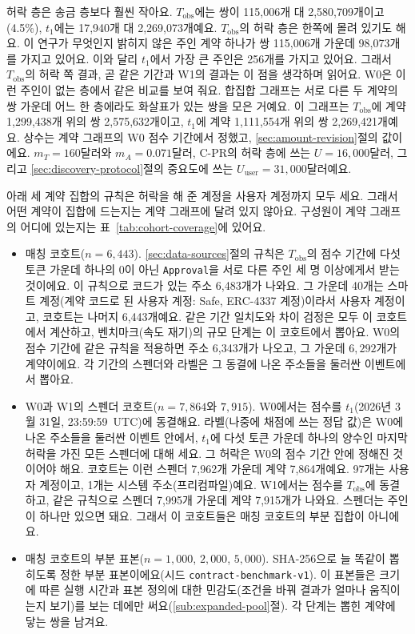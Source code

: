 

허락 층은 송금 층보다 훨씬 작아요. $T_{\mathrm{obs}}$에는 쌍이 115,006개 대 2,580,709개이고(4.5\%), $t_1$에는 17,940개 대 2,269,073개예요. $T_{\mathrm{obs}}$의 허락 층은 한쪽에 몰려 있기도 해요. 이 연구가 무엇인지 밝히지 않은 주인 계약 하나가 쌍 115,006개 가운데 98,073개를 가지고 있어요. 이와 달리 $t_1$에서 가장 큰 주인은 256개를 가지고 있어요. 그래서 $T_{\mathrm{obs}}$의 허락 쪽 결과, 곧 같은 기간과 W1의 결과는 이 점을 생각하며 읽어요. W0은 이런 주인이 없는 층에서 같은 비교를 보여 줘요. 합집합 그래프는 서로 다른 두 계약의 쌍 가운데 어느 한 층에라도 화살표가 있는 쌍을 모은 거예요. 이 그래프는 $T_{\mathrm{obs}}$에 계약 1,299,438개 위의 쌍 2,575,632개이고, $t_1$에 계약 1,111,554개 위의 쌍 2,269,421개예요. 상수는 계약 그래프의 W0 점수 기간에서 정했고, \ref{sec:amount-revision}절의 값이에요. $m_T=160$달러와 $m_A=0.071$달러, \mbox{C-PR}의 허락 층에 쓰는 $U=16{,}000$달러, 그리고 \ref{sec:discovery-protocol}절의 중요도에 쓰는 $U_{\mathrm{user}}=31{,}000$달러예요.


아래 세 계약 집합의 규칙은 허락을 해 준 계정을 사용자 계정까지 모두 세요. 그래서 어떤 계약이 집합에 드는지는 계약 그래프에 달려 있지 않아요. 구성원이 계약 그래프의 어디에 있는지는 표~\ref{tab:cohort-coverage}에 있어요.

\begin{itemize}
\item 매칭 코호트($n=6{,}443$). \ref{sec:data-sources}절의 규칙은 $T_{\mathrm{obs}}$의 점수 기간에 다섯 토큰 가운데 하나의 0이 아닌 \texttt{Approval}을 서로 다른 주인 세 명 이상에게서 받는 것이에요. 이 규칙으로 코드가 있는 주소 6,483개가 나와요. 그 가운데 40개는 스마트 계정(계약 코드로 된 사용자 계정: Safe, ERC-4337 계정)이라서 사용자 계정이고, 코호트는 나머지 6,443개예요. 같은 기간 일치도와 차이 검정은 모두 이 코호트에서 계산하고, 벤치마크(속도 재기)의 규모 단계는 이 코호트에서 뽑아요. W0의 점수 기간에 같은 규칙을 적용하면 주소 6,343개가 나오고, 그 가운데 $6{,}292$개가 계약이에요. 각 기간의 스펜더와 라벨은 그 동결에 나온 주소들을 둘러싼 이벤트에서 뽑아요.
\item W0과 W1의 스펜더 코호트($n=7{,}864$와 $7{,}915$). W0에서는 점수를 $t_1$(2026년 3월 31일, 23:59:59~UTC)에 동결해요. 라벨(나중에 채점에 쓰는 정답 값)은 W0에 나온 주소들을 둘러싼 이벤트 안에서, $t_1$에 다섯 토큰 가운데 하나의 양수인 마지막 허락을 가진 모든 스펜더에 대해 세요. 그 허락은 W0의 점수 기간 안에 정해진 것이어야 해요. 코호트는 이런 스펜더 7,962개 가운데 계약 7,864개예요. 97개는 사용자 계정이고, 1개는 시스템 주소(프리컴파일)예요. W1에서는 점수를 $T_{\mathrm{obs}}$에 동결하고, 같은 규칙으로 스펜더 7,995개 가운데 계약 7,915개가 나와요. 스펜더는 주인이 하나만 있으면 돼요. 그래서 이 코호트들은 매칭 코호트의 부분 집합이 아니에요.
\item 매칭 코호트의 부분 표본($n=1{,}000$, $2{,}000$, $5{,}000$). SHA-256으로 늘 똑같이 뽑히도록 정한 부분 표본이에요(시드 \texttt{contract-benchmark-v1}). 이 표본들은 크기에 따른 실행 시간과 표본 정의에 대한 민감도(조건을 바꿔 결과가 얼마나 움직이는지 보기)를 보는 데에만 써요(\ref{sub:expanded-pool}절). 각 단계는 뽑힌 계약에 닿는 쌍을 남겨요.
\end{itemize}


